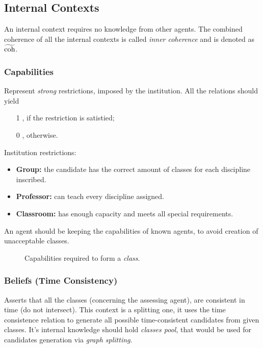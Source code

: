 \subsection{Internal Contexts}

An internal context requires no knowledge from other agents.
The combined coherence of all the internal contexts is called
\emph{inner coherence} and is denoted as $\mathrm{\widetilde{coh}}$.

\subsubsection{Capabilities}

Represent \emph{strong} restrictions, imposed by the institution.
All the relations should yield
\begin{itemize}
  \item [1], if the restriction is satistied;
  \item [0], otherwise.
\end{itemize}

Institution restrictions:
\begin{itemize}
\item \textbf{Group:} the candidate has the correct amount of classes for each
  discipline inscribed.
\item \textbf{Professor:} can teach every discipline assigned.
\item \textbf{Classroom:} has enough capacity and meets all special requirements.
\end{itemize}

An agent should be keeping the capabilities of known agents, to avoid creation
of unacceptable classes.

\begin{figure}[h]
  \centering
  
  \caption{Capabilities required to form a \emph{class}.}
  \label{fig:capabilities}
\end{figure}


\subsubsection{Beliefs (Time Consistency)}

Asserts that all the classes (concerning the assessing agent), are consistent in
time (do not intersect). This context is a splitting one, it uses the time
consistence relation to generate all possible time-consistent candidates from
given classes. It's internal knowledge should hold \emph{classes pool}, that
would be used for candidates generation via \emph{graph splitting}.
\\

